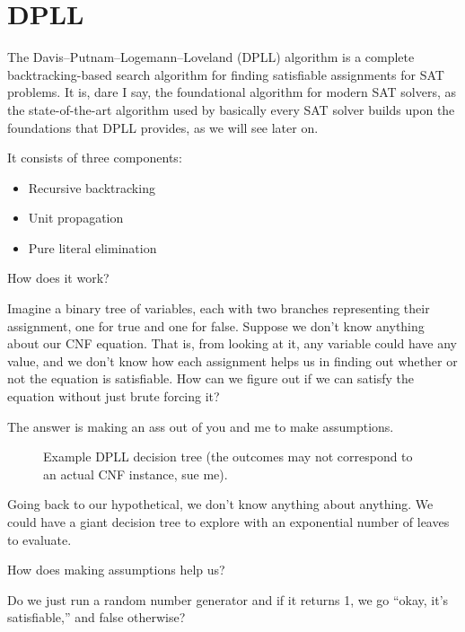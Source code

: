 \chapter{DPLL}

The Davis--Putnam--Logemann--Loveland (DPLL) algorithm is a complete
backtracking-based search algorithm for finding satisfiable assignments for SAT
problems. It is, dare I say, the foundational algorithm for modern SAT solvers,
as the state-of-the-art algorithm used by basically every SAT solver builds upon
the foundations that DPLL provides, as we will see later on.

It consists of three components:

\begin{itemize}
    \item Recursive backtracking
    \item Unit propagation
    \item Pure literal elimination
\end{itemize}

How does it work?

Imagine a binary tree of variables, each with two branches representing their
assignment, one for true and one for false. Suppose we don't know anything
about our CNF equation. That is, from looking at it, any variable could have
any value, and we don't know how each assignment helps us in finding out
whether or not the equation is satisfiable. How can we figure out if we can
satisfy the equation without just brute forcing it?

The answer is making an ass out of you and me to make assumptions.

\begin{figure}[H]
    \centering
    \caption{Example DPLL decision tree (the outcomes may not correspond to an
    actual CNF instance, sue me).}
\end{figure}

Going back to our hypothetical, we don't know anything about anything. We
could have a giant decision tree to explore with an exponential number of leaves
to evaluate.

How does making assumptions help us?

Do we just run a random number generator and if it returns 1, we go ``okay,
it's satisfiable,'' and false otherwise?

